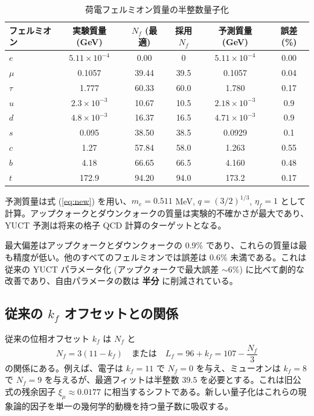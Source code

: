 \documentclass[12pt,a4paper]{article}
\begin{document}
	\begin{table}[H]
		\centering
		\caption{荷電フェルミオン質量の半整数量子化}
		\label{tab:new_masses}
		\small
		\begin{tabular}{l c c c c c}
			\toprule
			フェルミオン & 実験質量 (GeV) & \(N_f\) (最適) & 採用 \(N_f\) & 予測質量 (GeV) & 誤差 (\%) \\
			\midrule
			\(e\)   & \(5.11\times10^{-4}\) & 0.00  & 0      & \(5.11\times10^{-4}\) & 0.00 \\
			\(\mu\)  & 0.1057                & 39.44 & 39.5   & 0.1057               & 0.04 \\
			\(\tau\) & 1.777                 & 60.33 & 60.0   & 1.780                & 0.17 \\
			\(u\)   & \(2.3\times10^{-3}\)    & 10.67 & 10.5   & \(2.18\times10^{-3}\)  & 0.9 \\
			\(d\)   & \(4.8\times10^{-3}\)    & 16.37 & 16.5   & \(4.71\times10^{-3}\)  & 0.9 \\
			\(s\)   & 0.095                 & 38.50 & 38.5   & 0.0929               & 0.1 \\
			\(c\)   & 1.27                  & 57.84 & 58.0   & 1.263                & 0.55 \\
			\(b\)   & 4.18                  & 66.65 & 66.5   & 4.160                & 0.48 \\
			\(t\)   & 172.9                 & 94.20 & 94.0   & 173.2                & 0.17 \\
			\bottomrule
		\end{tabular}
		\par\smallskip
		\footnotesize 予測質量は式 (\ref{eq:new}) を用い、\(m_e = 0.511\) MeV, \(q = (3/2)^{1/3}\), \(\eta_f = 1\) として計算。アップクォークとダウンクォークの質量は実験的不確かさが最大であり、YUCT 予測は将来の格子 QCD 計算のターゲットとなる。
	\end{table}
	
	最大偏差はアップクォークとダウンクォークの 0.9\% であり、これらの質量は最も精度が低い。他のすべてのフェルミオンでは誤差は 0.6\% 未満である。これは従来の YUCT パラメータ化 (アップクォークで最大誤差 \(\sim 6\%\)) に比べて劇的な改善であり、自由パラメータの数は \textbf{半分} に削減されている。
	
	\subsection{従来の \(k_f\) オフセットとの関係}
	
	従来の位相オフセット \(k_f\) は \(N_f\) と
	\begin{equation}
		N_f = 3(11 - k_f) \quad \text{または} \quad L_f = 96 + k_f = 107 - \frac{N_f}{3}
	\end{equation}
	の関係にある。例えば、電子は \(k_f = 11\) で \(N_f = 0\) を与え、ミューオンは \(k_f = 8\) で \(N_f = 9\) を与えるが、最適フィットは半整数 \(39.5\) を必要とする。これは旧公式の残余因子 \(\xi_\mu \approx 0.0177\) に相当するシフトである。新しい量子化はこれらの現象論的因子を単一の幾何学的動機を持つ量子数に吸収する。
	
\end{document}
